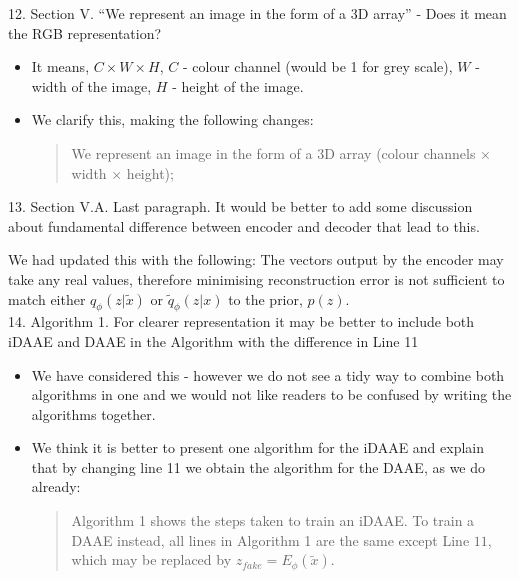 \documentclass{article}
\begin{document}
{\color{blue}
12. Section V. ``We represent an image in the form of a 3D array'' - Does it mean the RGB representation?}
\begin{itemize}
    \item It means, $C \times W \times H$, $C$ - colour channel (would be 1 for grey scale), $W$ - width of the image, $H$ - height of the image.
    \item We clarify this, making the following changes:
    \begin{quote}
        We represent an image in the form of a $3$D array (colour channels $\times$ width $\times$ height);
    \end{quote}
\end{itemize}

{\color{blue}
13. Section V.A. Last paragraph. It would be better to add some discussion about fundamental difference between encoder and decoder that lead to this.}

{\color{red}
We had updated this with the following:
The vectors output by the encoder may take any real values, therefore minimising reconstruction error is not sufficient to match either $q_\phi(z|\tilde{x})$ or $\tilde{q}_\phi(z|x)$ to the prior, $p(z)$. 
}\\


{\color{blue}
14. Algorithm 1. For clearer representation it may be better to include both iDAAE and DAAE in the Algorithm with the difference in Line 11}

\begin{itemize}
    \item We have considered this - however we do not see a tidy way to combine both algorithms in one and we would not like readers to be confused by writing the algorithms together.
    \item We think it is better to present one algorithm for the iDAAE and explain that by changing line 11 we obtain the algorithm for the DAAE, as we do already:
    \begin{quote}
        Algorithm 1 shows the steps taken to train an iDAAE. To train a DAAE instead, all lines in Algorithm 1 are the same except Line $11$, which may be replaced by $z_{fake} = E_\phi(\tilde{x})$.
    \end{quote}
\end{itemize}
\end{document}
